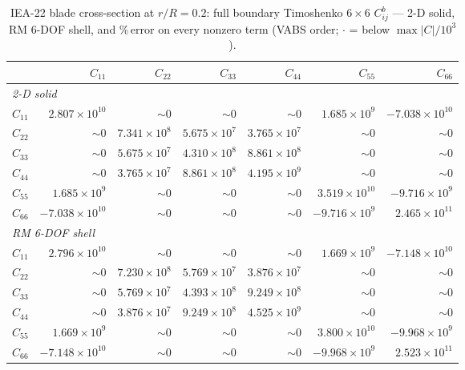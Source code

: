 \begin{table}[t]\centering\small
\caption{IEA-22 blade cross-section at $r/R=0.2$: full boundary Timoshenko $6\times6$ $C^{b}_{ij}$ --- 2-D solid, RM 6-DOF shell, and \%\,error on every nonzero term (VABS order; $\cdot$ = below $\max|C|/10^3$).}\label{tab:iea_iea_r020}
\setlength{\tabcolsep}{4pt}\renewcommand{\arraystretch}{1.1}
\begin{tabular}{lrrrrrr}
\toprule
 & $C_{11}$ & $C_{22}$ & $C_{33}$ & $C_{44}$ & $C_{55}$ & $C_{66}$\\
\midrule
\multicolumn{7}{l}{\textit{2-D solid}}\\
$C_{11}$ & $2.807\!\times\!10^{10}$ & $\sim\!0$ & $\sim\!0$ & $\sim\!0$ & $1.685\!\times\!10^{9}$ & $-7.038\!\times\!10^{10}$\\
$C_{22}$ & $\sim\!0$ & $7.341\!\times\!10^{8}$ & $5.675\!\times\!10^{7}$ & $3.765\!\times\!10^{7}$ & $\sim\!0$ & $\sim\!0$\\
$C_{33}$ & $\sim\!0$ & $5.675\!\times\!10^{7}$ & $4.310\!\times\!10^{8}$ & $8.861\!\times\!10^{8}$ & $\sim\!0$ & $\sim\!0$\\
$C_{44}$ & $\sim\!0$ & $3.765\!\times\!10^{7}$ & $8.861\!\times\!10^{8}$ & $4.195\!\times\!10^{9}$ & $\sim\!0$ & $\sim\!0$\\
$C_{55}$ & $1.685\!\times\!10^{9}$ & $\sim\!0$ & $\sim\!0$ & $\sim\!0$ & $3.519\!\times\!10^{10}$ & $-9.716\!\times\!10^{9}$\\
$C_{66}$ & $-7.038\!\times\!10^{10}$ & $\sim\!0$ & $\sim\!0$ & $\sim\!0$ & $-9.716\!\times\!10^{9}$ & $2.465\!\times\!10^{11}$\\
\midrule
\multicolumn{7}{l}{\textit{RM 6-DOF shell}}\\
$C_{11}$ & $2.796\!\times\!10^{10}$ & $\sim\!0$ & $\sim\!0$ & $\sim\!0$ & $1.669\!\times\!10^{9}$ & $-7.148\!\times\!10^{10}$\\
$C_{22}$ & $\sim\!0$ & $7.230\!\times\!10^{8}$ & $5.769\!\times\!10^{7}$ & $3.876\!\times\!10^{7}$ & $\sim\!0$ & $\sim\!0$\\
$C_{33}$ & $\sim\!0$ & $5.769\!\times\!10^{7}$ & $4.393\!\times\!10^{8}$ & $9.249\!\times\!10^{8}$ & $\sim\!0$ & $\sim\!0$\\
$C_{44}$ & $\sim\!0$ & $3.876\!\times\!10^{7}$ & $9.249\!\times\!10^{8}$ & $4.525\!\times\!10^{9}$ & $\sim\!0$ & $\sim\!0$\\
$C_{55}$ & $1.669\!\times\!10^{9}$ & $\sim\!0$ & $\sim\!0$ & $\sim\!0$ & $3.800\!\times\!10^{10}$ & $-9.968\!\times\!10^{9}$\\
$C_{66}$ & $-7.148\!\times\!10^{10}$ & $\sim\!0$ & $\sim\!0$ & $\sim\!0$ & $-9.968\!\times\!10^{9}$ & $2.523\!\times\!10^{11}$\\

\end{tabular}
\end{table}

